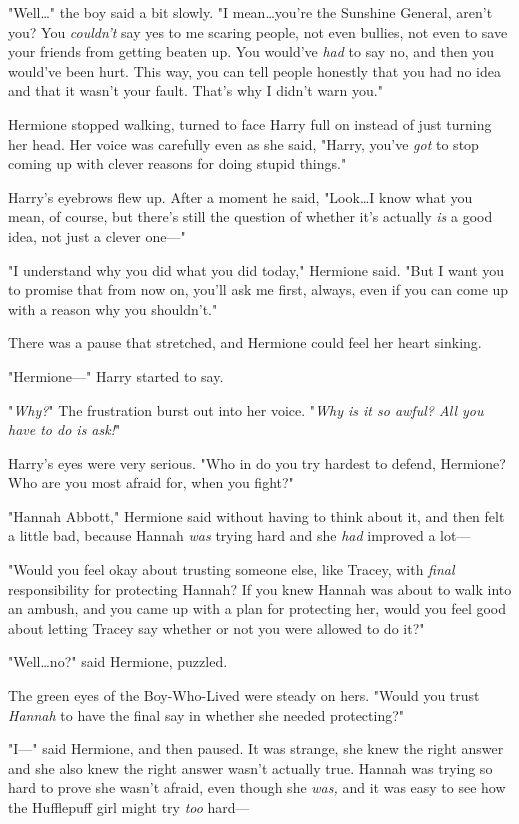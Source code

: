"Well…" the boy said a bit slowly. "I mean…you're the Sunshine
General, aren't you? You \emph{couldn't} say yes to me scaring people, not even
bullies, not even to save your friends from getting beaten up. You would've
\emph{had} to say no, and then you would've been hurt. This way, you can tell
people honestly that you had no idea and that it wasn't your fault. That's why
I didn't warn you."

Hermione stopped walking, turned to face Harry full on instead of just turning
her head. Her voice was carefully even as she said, "Harry, you've \emph{got}
to stop coming up with clever reasons for doing stupid things."

Harry's eyebrows flew up. After a moment he said, "Look…I know what you
mean, of course, but there's still the question of whether it's actually
\emph{is} a good idea, not just a clever one—"

"I understand why you did what you did today," Hermione said. "But I want you
to promise that from now on, you'll ask me first, always, even if you can come
up with a reason why you shouldn't."

There was a pause that stretched, and Hermione could feel her heart sinking.

"Hermione—" Harry started to say.

"\emph{Why?}" The frustration burst out into her voice. "\emph{Why is it so
awful? All you have to do is ask!}"

Harry's eyes were very serious. "Who in \SPHEW do you try hardest to
defend, Hermione? Who are you most afraid for, when you fight?"

"Hannah Abbott," Hermione said without having to think about it, and then felt
a little bad, because Hannah \emph{was} trying hard and she \emph{had} improved
a lot—

"Would you feel okay about trusting someone else, like Tracey, with
\emph{final} responsibility for protecting Hannah? If you knew Hannah was about
to walk into an ambush, and you came up with a plan for protecting her, would
you feel good about letting Tracey say whether or not you were allowed to do
it?"

"Well…no?" said Hermione, puzzled.

The green eyes of the Boy-Who-Lived were steady on hers. "Would you trust
\emph{Hannah} to have the final say in whether she needed protecting?"

"I—" said Hermione, and then paused. It was strange, she knew the right
answer and she also knew the right answer wasn't actually true. Hannah was
trying so hard to prove she wasn't afraid, even though she \emph{was,} and it
was easy to see how the Hufflepuff girl might try \emph{too} hard—

